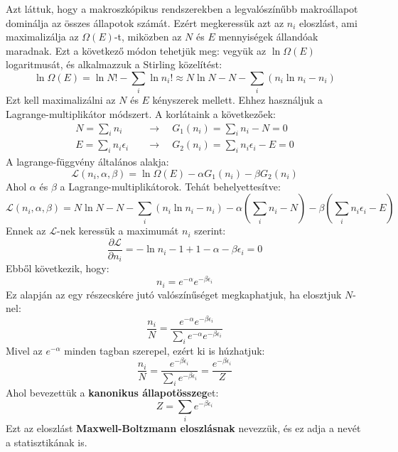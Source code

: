 \documentclass[../main.tex]{subfiles}
\begin{document}
Azt láttuk, hogy a makroszkópikus rendszerekben a legvalószínűbb makroállapot dominálja az összes állapotok számát. Ezért megkeressük azt az $n_i$ eloszlást, ami maximalizálja az $\Omega(E)$-t,
miközben az $N$ és $E$ mennyiségek állandóak maradnak. Ezt a következő módon tehetjük meg: vegyük az $\ln \Omega(E)$ logaritmusát, és alkalmazzuk a Stirling közelítést:
\begin{equation}
    \ln \Omega(E) = \ln N! - \sum_i \ln n_i! \approx N \ln N - N - \sum_i (n_i \ln n_i - n_i)
\end{equation}
Ezt kell maximalizálni az $N$ és $E$ kényszerek mellett. Ehhez használjuk a Lagrange-multiplikátor módszert. A korlátaink a következőek:
\begin{equation}
    \begin{aligned}
        N = \sum_i n_i &\quad \rightarrow \quad G_1(n_i) = \sum_i n_i - N = 0 \\
        E = \sum_i n_i \epsilon_i &\quad \rightarrow \quad G_2(n_i) = \sum_i n_i \epsilon_i - E = 0
    \end{aligned}
\end{equation}
A lagrange-függvény általános alakja:
\begin{equation}
    \mathcal{L}(n_i, \alpha, \beta) = \ln \Omega(E) - \alpha G_1(n_i) - \beta G_2(n_i)
\end{equation}
Ahol $\alpha$ és $\beta$ a Lagrange-multiplikátorok. Tehát behelyettesítve:
\begin{equation}
    \mathcal{L}(n_i, \alpha, \beta) = N \ln N - N - \sum_i (n_i \ln n_i - n_i) - \alpha \left( \sum_i n_i - N \right) - \beta \left( \sum_i n_i \epsilon_i - E \right)
\end{equation}
Ennek az $\mathcal{L}$-nek keressük a maximumát $n_i$ szerint:
\begin{equation}
    \frac{\partial \mathcal{L}}{\partial n_i} = - \ln n_i - 1 + 1 - \alpha - \beta \epsilon_i = 0
\end{equation}
Ebből következik, hogy:
\begin{equation}
    n_i = e^{-\alpha} e^{-\beta \epsilon_i}
\end{equation}
Ez alapján az egy részecskére jutó valószínűséget megkaphatjuk, ha elosztjuk $N$-nel:
\begin{equation}
    \frac{n_i}{N} = \frac{e^{-\alpha} e^{-\beta \epsilon_i}}{\sum_i e^{-\alpha} e^{-\beta \epsilon_i}}
\end{equation}
Mivel az $e^{-\alpha}$ minden tagban szerepel, ezért ki is húzhatjuk:
\begin{equation}
    \frac{n_i}{N} = \frac{e^{-\beta \epsilon_i}}{\sum_i e^{-\beta \epsilon_i}} = \frac{e^{-\beta \epsilon_i}}{Z}
\end{equation}
Ahol bevezettük a \textbf{kanonikus állapotösszeg}et:
\begin{equation}
    Z = \sum_i e^{-\beta \epsilon_i}
\end{equation}
Ezt az eloszlást \textbf{Maxwell-Boltzmann eloszlásnak} nevezzük, és ez adja a nevét a statisztikának is.
\end{document}
